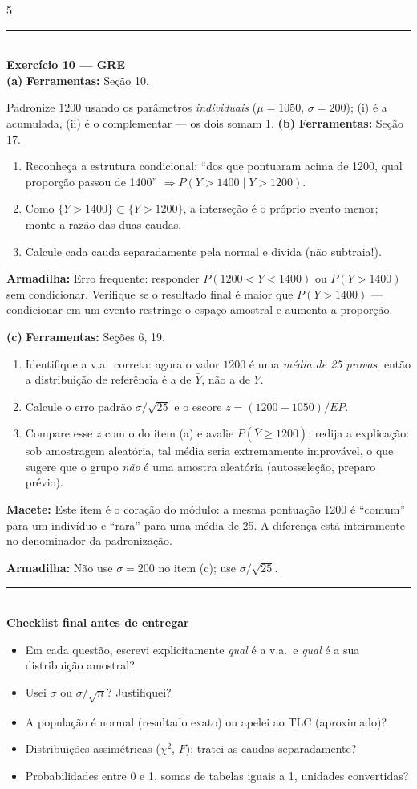 \documentclass[a4paper,8pt]{extarticle}
\newcommand{\tit}[1]{\vspace{2pt}\textcolor{azul}{\rule{\linewidth}{0.6pt}}\\[1pt]\textbf{\textcolor{azul}{#1}}\\[1pt]}
\newcommand{\mac}[1]{\textcolor{verde}{\textbf{Macete:}} #1\par}
\newcommand{\arm}[1]{\textcolor{vinho}{\textbf{Armadilha:}} #1\par}
\newcommand{\ferr}[1]{\textbf{Ferramentas:} #1\par}
\begin{document}
\begin{multicols*}{5}
\tit{Exercício 10 — GRE}
\textbf{(a)} \ferr{Seção 10.} Padronize $1200$ usando os parâmetros \emph{individuais} ($\mu=1050$, $\sigma=200$); (i) é a acumulada, (ii) é o complementar — os dois somam 1.
\textbf{(b)} \ferr{Seção 17.}
\begin{enumerate}
\item Reconheça a estrutura condicional: “dos que pontuaram acima de 1200, qual proporção passou de 1400” $\Rightarrow P(Y>1400\mid Y>1200)$.
\item Como $\{Y>1400\}\subset\{Y>1200\}$, a interseção é o próprio evento menor; monte a razão das duas caudas.
\item Calcule cada cauda separadamente pela normal e divida (não subtraia!).
\end{enumerate}
\arm{Erro frequente: responder $P(1200<Y<1400)$ ou $P(Y>1400)$ sem condicionar. Verifique se o resultado final é maior que $P(Y>1400)$ — condicionar em um evento restringe o espaço amostral e aumenta a proporção.}
\textbf{(c)} \ferr{Seções 6, 19.}
\begin{enumerate}
\item Identifique a v.a.\ correta: agora o valor $1200$ é uma \emph{média de 25 provas}, então a distribuição de referência é a de $\bar Y$, não a de $Y$.
\item Calcule o erro padrão $\sigma/\sqrt{25}$ e o escore $z=(1200-1050)/EP$.
\item Compare esse $z$ com o do item (a) e avalie $P(\bar Y\ge1200)$; redija a explicação: sob amostragem aleatória, tal média seria extremamente improvável, o que sugere que o grupo \emph{não} é uma amostra aleatória (autosseleção, preparo prévio).
\end{enumerate}
\mac{Este item é o coração do módulo: a mesma pontuação 1200 é “comum” para um indivíduo e “rara” para uma média de 25. A diferença está inteiramente no denominador da padronização.}
\arm{Não use $\sigma=200$ no item (c); use $\sigma/\sqrt{25}$.}

\tit{Checklist final antes de entregar}
\begin{itemize}
\item Em cada questão, escrevi explicitamente \emph{qual} é a v.a.\ e \emph{qual} é a sua distribuição amostral?
\item Usei $\sigma$ ou $\sigma/\sqrt n$? Justifiquei?
\item A população é normal (resultado exato) ou apelei ao TLC (aproximado)?
\item Distribuições assimétricas ($\chi^2$, $F$): tratei as caudas separadamente?
\item Probabilidades entre 0 e 1, somas de tabelas iguais a 1, unidades convertidas?
\end{itemize}

\end{multicols*}
\end{document}

